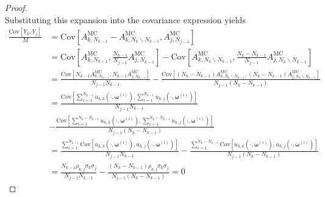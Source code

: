 \begin{proof}
\begin{equation*}
\end{equation*}
%
Substituting this expansion into the covariance expression yields
%
\begin{align*}
    \frac{\text{Cov}\left[Y_k,Y_j\right]}{M} &= \text{Cov}\left[A_{k,N_{k-1}}^{\text{MC}} - A_{k,N_{k}\backslash N_{k-1}}^{\text{MC}}, A_{j,N_{j-1}}^{\text{MC}}\right]\\
    &=\text{Cov}\left[A_{k,N_{k-1}}^{\text{MC}}, \frac{N_{k-1}}{N_{j-1}}A_{j,N_{k-1}}^{\text{MC}}\right]-\text{Cov}\left[ A_{k,N_{k}\backslash N_{k-1}}^{\text{MC}}, \frac{N_k - N_{k-1}}{N_{j-1}} A_{j,N_{k}\backslash N_{k-1}}^{\text{MC}} \right]\\
    &=\frac{\text{Cov}\left[N_{k-1}A_{k,N_{k-1}}^{\text{MC}}, N_{k-1} A_{j,N_{k-1}}^{\text{MC}}\right]}{N_{j-1}N_{k-1}}-\frac{\text{Cov}\left[(N_k-N_{k-1}) A_{k,N_{k}\backslash N_{k-1}}^{\text{MC}}, (N_k - N_{k-1}) A_{j,N_{k}\backslash N_{k-1}}^{\text{MC}} \right]}{N_{j-1}(N_k-N_{k-1})}\\
    &=\frac{\text{Cov}\left[\sum_{i=1}^{N_{k-1}}u_{h,k}\left(\cdot, \boldsymbol{\omega}^{(i)}\right),\sum_{i=1}^{N_{k-1}}u_{h,j}\left(\cdot, \boldsymbol{\omega}^{(i)}\right)\right]}{N_{j-1}N_{k-1}}\\
    &-\frac{\text{Cov}\left[\sum_{i=1}^{N_k-N_{k-1}}u_{h,k}\left(\cdot, \boldsymbol{\omega}^{(i)}\right), \sum_{i=1}^{N_k-N_{k-1}}u_{h,j}\left(\cdot, \boldsymbol{\omega}^{(i)}\right)\right]}{N_{j-1}(N_k-N_{k-1})}\\
    &=\frac{\sum_{i=1}^{N_{k-1}}\text{Cov}\left[u_{h,k}\left(\cdot, \boldsymbol{\omega}^{(i)}\right),u_{h,j}\left(\cdot, \boldsymbol{\omega}^{(i)}\right)\right]}{N_{j-1}N_{k-1}} -\frac{\sum_{i=1}^{N_k-N_{k-1}}\text{Cov}\left[u_{h,k}\left(\cdot, \boldsymbol{\omega}^{(i)}\right), u_{h,j}\left(\cdot, \boldsymbol{\omega}^{(i)}\right)\right]}{N_{j-1}(N_k-N_{k-1})}\\
    &=\frac{N_{k-1}\rho_{k,j}\sigma_k\sigma_j}{N_{j-1}N_{k-1}}-\frac{(N_k-N_{k-1})\rho_{k,j}\sigma_k\sigma_j}{N_{j-1}(N_k-N_{k-1})}=0
\end{align*}
\end{proof}



